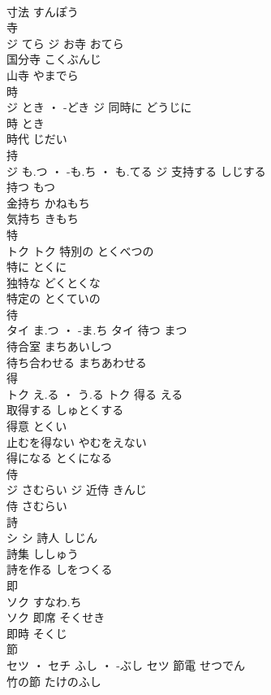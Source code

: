 \documentclass[8pt]{extreport}
\begin{document}
\begin{CJK}{UTF8}{min}
\\	寸法	すんぽう	
\\	寺	
\\	ジ	てら	ジ	お寺	おてら	
\\	国分寺	こくぶんじ	
\\	山寺	やまでら	
\\	時	
\\	ジ	とき ・ -どき	ジ	同時に	どうじに	
\\	時	とき	
\\	時代	じだい	
\\	持	
\\	ジ	も.つ ・ -も.ち ・ も.てる	ジ	支持する	しじする	
\\	持つ	もつ	
\\	金持ち	かねもち	
\\	気持ち	きもち	
\\	特	
\\	トク		トク	特別の	とくべつの	
\\	特に	とくに	
\\	独特な	どくとくな	
\\	特定の	とくていの	
\\	待	
\\	タイ	ま.つ ・ -ま.ち	タイ	待つ	まつ	
\\	待合室	まちあいしつ	
\\	待ち合わせる	まちあわせる	
\\	得	
\\	トク	え.る ・ う.る	トク	得る	える	
\\	取得する	しゅとくする	
\\	得意	とくい	
\\	止むを得ない	やむをえない	
\\	得になる	とくになる	
\\	侍	
\\	ジ	さむらい	ジ	近侍	きんじ	
\\	侍	さむらい	
\\	詩	
\\	シ		シ	詩人	しじん	
\\	詩集	ししゅう	
\\	詩を作る	しをつくる	
\\	即	
\\	ソク	すなわ.ち
\\	ソク	即席	そくせき	
\\	即時	そくじ	
\\	節	
\\	セツ ・ セチ	ふし ・ -ぶし	セツ	節電	せつでん	
\\	竹の節	たけのふし	

\end{CJK}
\end{document}
